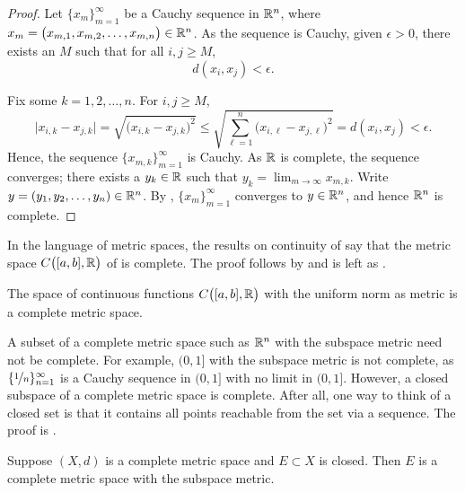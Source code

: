 \begin{proof}
Let $\{ x_m \}_{m=1}^\infty$ be a Cauchy sequence
in ${\mathbb{R}}^n$, where $x_m = \bigl(x_{m,1},x_{m,2},\ldots,x_{m,n}\bigr) \in {\mathbb{R}}^n$.
As the sequence is Cauchy, given $\epsilon > 0$, there exists an $M$ such that for all
$i,j \geq M$,
\begin{equation*}
d(x_i,x_j) < \epsilon.
\end{equation*}

Fix some $k=1,2,\ldots,n$.  For $i,j \geq M$,
\begin{equation*}
\bigl\lvert x_{i,k} - x_{j,k} \bigr\rvert
=
\sqrt{{\bigl(x_{i,k} - x_{j,k}\bigr)}^2}
\leq
\sqrt{\sum_{\ell=1}^n {\bigl(x_{i,\ell}-x_{j,\ell}\bigr)}^2}
= d(x_i,x_j) < \epsilon .
\end{equation*}
Hence, the sequence $\{ x_{m,k} \}_{m=1}^\infty$ is Cauchy.  As ${\mathbb{R}}$ is
complete, the sequence converges; there exists a $y_k \in {\mathbb{R}}$ such that
$y_k = \lim_{m\to\infty} x_{m,k}$.
Write $y = (y_1,y_2,\ldots,y_n) \in {\mathbb{R}}^n$.
By , $\{ x_m \}_{m=1}^\infty$ converges
to $y \in {\mathbb{R}}^n$, and hence ${\mathbb{R}}^n$ is complete.
\end{proof}

In the language of metric spaces,
the results on continuity of 
say that the metric space
$C\bigl([a,b],{\mathbb{R}}\bigr)$ of  is complete.
The proof follows by  
and is left as .

\begin{prop} \label{prop:CabRcomplete}
The space of continuous functions $C\bigl([a,b],{\mathbb{R}}\bigr)$ with the uniform
norm as metric is a complete metric space.
\end{prop}

A subset of a complete metric space such as ${\mathbb{R}}^n$ with the subspace metric need not be
complete.  For example, $(0,1]$ with the subspace metric is not
complete, as $\{ \nicefrac{1}{n} \}_{n=1}^\infty$ is a Cauchy sequence in $(0,1]$
with no limit in $(0,1]$.
However, 
a closed subspace of a complete metric space is
complete.  After all, one way
to think of a closed set is that it contains all points
reachable from the set via a sequence.
The proof is 
.

\begin{prop} \label{prop:closedcomplete}
Suppose $(X,d)$ is a complete metric space and $E \subset X$
is closed.
Then $E$ is a complete metric space with the subspace metric.
\end{prop}

